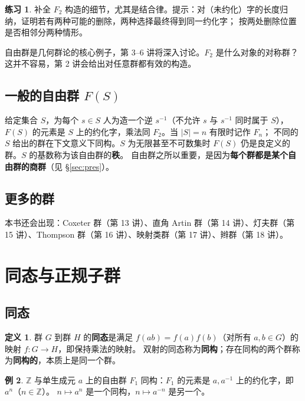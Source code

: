 \documentclass[11pt,a4paper]{article}
\theoremstyle{definition}
\newtheorem{definition}{定义}[section]
\newtheorem{example}[definition]{例}
\newtheorem{exercise}{练习}
\theoremstyle{plain}
\theoremstyle{remark}
\newcommand{\Z}{\mathbb{Z}}
\begin{document}
\begin{exercise}
补全 $F_2$ 构造的细节，尤其是结合律。提示：对（未约化）字的长度归纳，证明若有两种可能的删除，两种选择最终得到同一约化字；
按两处删除位置是否相邻分两种情形。
\end{exercise}

自由群是几何群论的核心例子，第 3--6 讲将深入讨论。$F_2$ 是什么对象的对称群？这并不容易，第 2 讲会给出对任意群都有效的构造。

\subsection{一般的自由群 $F(S)$}

给定集合 $S$，为每个 $s\in S$ 人为造一个逆 $s^{-1}$（不允许 $s$ 与 $s^{-1}$ 同时属于 $S$），
$F(S)$ 的元素是 $S$ 上的约化字，乘法同 $F_2$。当 $|S|=n$ 有限时记作 $F_n$；
不同的 $S$ 给出的群在下文意义下同构。$S$ 为无限甚至不可数集时 $F(S)$ 仍是良定义的群。$S$ 的基数称为该自由群的\textbf{秩}。
自由群之所以重要，是因为\textbf{每个群都是某个自由群的商群}（见 \S\ref{sec:pres}）。

\subsection{更多的群}

本书还会出现：Coxeter 群（第 13 讲）、直角 Artin 群（第 14 讲）、灯夫群（第 15 讲）、Thompson 群（第 16 讲）、映射类群（第 17 讲）、辫群（第 18 讲）。

\section{同态与正规子群}

\subsection{同态}

\begin{definition}
群 $G$ 到群 $H$ 的\textbf{同态}是满足 $f(ab)=f(a)f(b)$（对所有 $a,b\in G$）的映射 $f:G\to H$，即保持乘法的映射。
双射的同态称为\textbf{同构}；存在同构的两个群称为\textbf{同构的}，本质上是同一个群。
\end{definition}

\begin{example}
$\Z$ 与单生成元 $a$ 上的自由群 $F_1$ 同构：$F_1$ 的元素是 $a,a^{-1}$ 上的约化字，即 $a^n$（$n\in\Z$）。
$n\mapsto a^n$ 是一个同构，$n\mapsto a^{-n}$ 是另一个。
\end{example}
\end{document}
